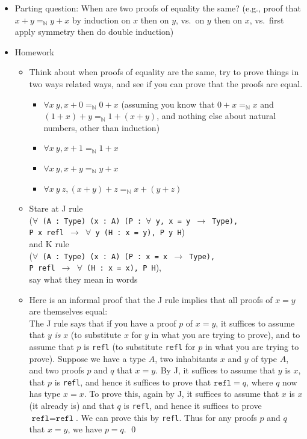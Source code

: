 \documentclass{article}
\begin{document}
\begin{itemize}
  \item Parting question: When are two proofs of equality the same? (e.g., proof that $x + y =_{\mathbb{N}} y + x$ by induction on $x$ then on $y$, vs.~on $y$ then on $x$, vs.~first apply symmetry then do double induction)
  \item Homework
    \begin{itemize}
      \item Think about when proofs of equality are the same, try to prove things in two ways related ways, and see if you can prove that the proofs are equal.
      \begin{itemize}
        \item $\forall x\ y, x + 0 =_{\mathbb{N}} 0 + x$ (assuming you know that $0 + x =_{\mathbb{N}} x$ and $(1 + x) + y =_{\mathbb{N}} 1 + (x + y)$, and nothing else about natural numbers, other than induction)
        \item $\forall x\ y, x + 1 =_{\mathbb{N}} 1 + x$
        \item $\forall x\ y, x + y =_{\mathbb{N}} y + x$
        \item $\forall x\ y\ z, (x + y) + z =_{\mathbb{N}} x + (y + z)$
      \end{itemize}
      \item Stare at J rule \\
        (\texttt{$\forall$~(A~:~Type) (x~:~A) (P~:~$\forall$ y, x = y $\to$ Type), \\ P x refl $\to$ $\forall$~y (H~:~x = y), P y H}) \\
        and K rule \\
        (\texttt{$\forall$~(A~:~Type) (x~:~A) (P~:~x = x $\to$ Type), \\ P refl $\to$ $\forall$~(H~:~x~=~x), P H}), \\
        say what they mean in words
      \item
        Here is an informal proof that the J rule implies that all proofs of $x = y$ are themselves equal: \\
        The J rule says that if you have a proof $p$ of $x = y$, it suffices to assume that $y$ \emph{is} $x$ (to substitute $x$ for $y$ in what you are trying to prove), and to assume that $p$ is \texttt{refl} (to substitute \texttt{refl} for $p$ in what you are trying to prove).  Suppose we have a type $A$, two inhabitants $x$ and $y$ of type $A$, and two proofs $p$ and $q$ that $x = y$.  By J, it suffices to assume that $y$ is $x$, that $p$ is \texttt{refl}, and hence it suffices to prove that $\texttt{refl} = q$, where $q$ now has type $x = x$.  To prove this, again by J, it suffices to assume that $x$ is $x$ (it already is) and that $q$ is \texttt{refl}, and hence it suffices to prove $\texttt{refl} = \texttt{refl}$.  We can prove this by \texttt{refl}.  Thus for any proofs $p$ and $q$ that $x = y$, we have $p = q$. \qed \\

\end{itemize}
\end{itemize}
\end{document}
